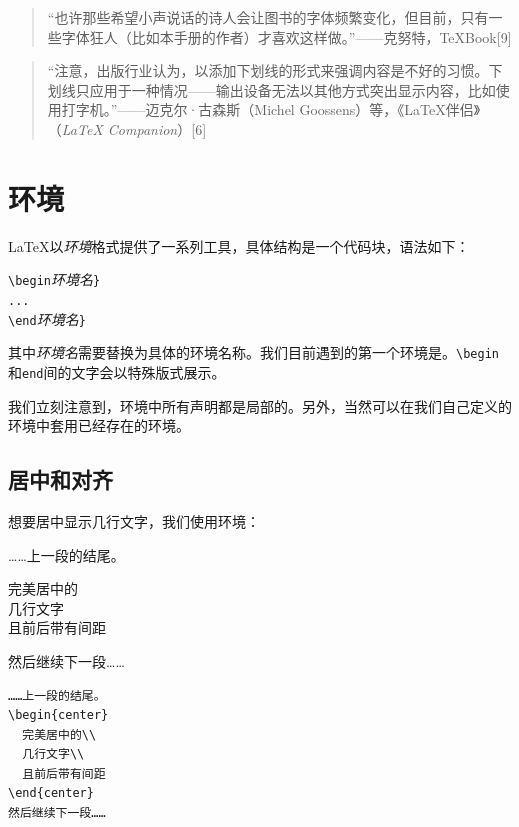\begin{quote}
    “也许那些希望{\tiny 小声说话}的诗人会让图书的字体频繁变化，但目前，只有一些字体狂人{\tiny （比如本手册的作者）}才喜欢这样做。”——克努特，\TeX Book[9]
\end{quote}

\begin{quote}
    “注意，出版行业认为，以添加下划线的形式来强调内容是不好的习惯。下划线只应用于一种情况——输出设备无法以其他方式突出显示内容，比如使用打字机。”——迈克尔·古森斯（Michel Goossens）等，《\LaTeX 伴侣》（\textit{\LaTeX{} Companion}）[6]
\end{quote}

\section{环境}

\LaTeX 以\emph{环境}格式提供了一系列工具，具体结构是一个代码块，语法如下：

\begin{dmd}
    \verb+\begin+\textsl{\<环境名\>}\verb|}|\\
    \verb|...|\\
    \verb+\end+\textsl{\<环境名\>}\verb|}|\\
\end{dmd}

其中\textsl{\<环境名\>}需要替换为具体的环境名称。我们目前遇到的第一个环境是。\verb|\begin| 和\verb|end|间的文字会以特殊版式展示。

\begin{exclamation}
    我们立刻注意到，环境中所有声明都是局部的。另外，当然可以在我们自己定义的环境中套用已经存在的环境。
\end{exclamation}

\subsection{居中和对齐}

想要居中显示几行文字，我们使用环境：

\begin{codelist}[2.5]{
    ……上一段的结尾。
    \begin{center}
        完美居中的\\
        几行文字\\
        且前后带有间距
    \end{center}
    然后继续下一段……
}\begin{verbatim}……上一段的结尾。
\begin{center}
  完美居中的\\
  几行文字\\
  且前后带有间距
\end{center}
然后继续下一段……
\end{verbatim}
\end{codelist}

